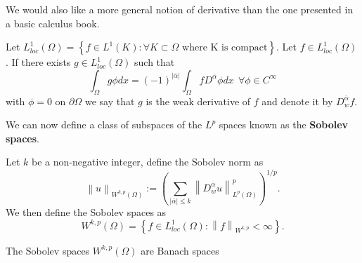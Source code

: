 \documentclass[../Main/main.tex]{subfiles}
\begin{document}
	We would also like a more general notion of derivative than the one presented in a basic calculus book.
	\begin{definition}
		Let $L_{loc}^1(\Omega) =\left \{  \right. f\in L^1(K):\forall K \subset \Omega \text{  where K is compact}\left.  \right \}$.
		Let $f \in L_{loc}^1(\Omega)$. If there exists $g\in L_{loc}^1 (\Omega)$ such that 
		\begin{equation}
			\int_{\Omega} g \phi dx = (-1)^{|\overline{\alpha}|} \int_{\Omega} f D^{\overline{\alpha}} \phi dx \ \ \forall \phi \in C^{\infty}
		\end{equation}
		 with $\phi = 0$ on $\partial \Omega$  we say that $g$ is the weak derivative of $f$ and denote it by $D_w^{\overline{\alpha}}f$.
	\end{definition}
	
	
	We can now define a class of subspaces of the $L^p$ spaces known as the \textbf{Sobolev spaces}.
	\begin{definition}
		Let $k$ be a non-negative integer, define the Sobolev norm as 
		\begin{equation*}
			\left \| u \right \|_{W^{k,p}(\Omega)} := \left (\sum_{|\overline{\alpha}| \leq k} \left \| D_w^{\overline{\alpha}}u \right \|_{L^p(\Omega)}^p\right )^{1/p}.
		\end{equation*}
		We then define the Sobolev spaces as 
		\begin{equation*}
			W^{k,p}(\Omega) = \left \{  \right. f\in L^1_{loc}(\Omega):\left \| f \right \|_{W^{k,p}}<\infty \left.  \right \}.
		\end{equation*}
	\end{definition}
	\begin{theorem}
		The Sobolev spaces $W^{k,p}(\Omega)$ are Banach spaces
	\end{theorem}
	
\end{document}
